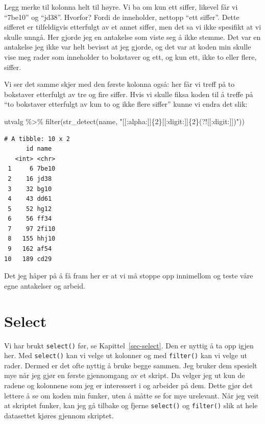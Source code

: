 \documentclass[
  letterpaper,
  DIV=11,
  numbers=noendperiod]{scrreprt}
\newenvironment{Shaded}{\begin{snugshade}}{\end{snugshade}}
\newcommand{\FunctionTok}[1]{\textcolor[rgb]{0.28,0.35,0.67}{#1}}
\newcommand{\NormalTok}[1]{\textcolor[rgb]{0.00,0.23,0.31}{#1}}
\newcommand{\SpecialCharTok}[1]{\textcolor[rgb]{0.37,0.37,0.37}{#1}}
\newcommand{\StringTok}[1]{\textcolor[rgb]{0.13,0.47,0.30}{#1}}
\begin{document}
Legg merke til kolonna helt til høyre. Vi ba om kun ett siffer, likevel
får vi ``7be10'' og ``jd38''. Hvorfor? Fordi de inneholder, nettopp
``ett siffer''. Dette sifferet er tilfeldigvis etterfulgt av et annet
siffer, men det sa vi ikke spesifikt at vi skulle unngå. Her gjorde jeg
en antakelse som viste seg å ikke stemme. Det var en antakelse jeg ikke
var helt bevisst at jeg gjorde, og det var at koden min skulle vise meg
rader som inneholder to bokstaver og ett, og kun ett, ikke to eller
flere, siffer.

Vi ser det samme skjer med den første kolonna også: her får vi treff på
to bokstaver etterfulgt av tre og fire siffer. Hvis vi skulle fiksa
koden til å treffe på ``to bokstaver etterfulgt av kun to og ikke flere
siffer'' kunne vi endra det slik:

\begin{Shaded}
\begin{Highlighting}[]
\NormalTok{utvalg }\SpecialCharTok{\%\textgreater{}\%} 
  \FunctionTok{filter}\NormalTok{(}\FunctionTok{str\_detect}\NormalTok{(name, }\StringTok{"[[:alpha:]]\{2\}[[:digit:]]\{2\}(?![[:digit:]])"}\NormalTok{))}
\end{Highlighting}
\end{Shaded}

\begin{verbatim}
# A tibble: 10 x 2
      id name 
   <int> <chr>
 1     6 7be10
 2    16 jd38 
 3    32 bg10 
 4    43 dd61 
 5    52 hg12 
 6    56 ff34 
 7    97 2fi10
 8   155 hhj10
 9   162 af54 
10   189 cd29 
\end{verbatim}

Det jeg håper på å få fram her er at vi må stoppe opp innimellom og
teste våre egne antakelser og arbeid.

\hypertarget{select}{%
\section{Select}\label{select}}

Vi har brukt \texttt{select()} før, se Kapittel~\ref{sec-select}. Den er
nyttig å ta opp igjen her. Med \texttt{select()} kan vi velge ut
kolonner og med \texttt{filter()} kan vi velge ut rader. Dermed er det
ofte nyttig å bruke begge sammen. Jeg bruker dem spesielt mye når jeg
gjør en første gjennomgang av et skript. Da velger jeg ut kun de radene
og kolonnene som jeg er interessert i og arbeider på dem. Dette gjør det
lettere å se om koden min funker, uten å måtte se for mye urelevant. Når
jeg veit at skriptet funker, kan jeg gå tilbake og fjerne
\texttt{select()} og \texttt{filter()} slik at hele datasettet kjøres
gjennom skriptet.
\end{document}
